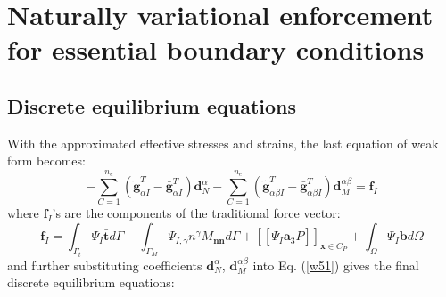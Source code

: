 \section{Naturally variational enforcement for essential boundary conditions}\label{boundary}
\subsection{Discrete equilibrium equations}
With the approximated effective stresses and strains, the last equation of weak form becomes:
\begin{equation}\label{w51}
- \sum_{C=1}^{n_e}(\tilde{\boldsymbol g}^T_{\alpha I} - \bar{\boldsymbol g}^T_{\alpha I}) \boldsymbol d_N^{\alpha}
- \sum_{C=1}^{n_e}(\tilde{\boldsymbol g}^T_{\alpha\beta I} - \bar{\boldsymbol g}^T_{\alpha\beta I}) \boldsymbol d_M^{\alpha\beta} = \boldsymbol f_I
\end{equation}
where $\boldsymbol f_I$'s are the components of the traditional force vector:
\begin{equation}
        \boldsymbol f_I = \int_{\Gamma_t} \Psi_I \bar{\boldsymbol t} d\Gamma - \int_{\Gamma_M} \Psi_{I,\gamma} n^\gamma \bar M_{\boldsymbol{nn}} d\Gamma + [[\Psi_I\boldsymbol a_3 \bar P]]_{\boldsymbol x\in C_P} + \int_\Omega \Psi_I \bar{\boldsymbol b} d\Omega
\end{equation}
and further substituting coefficients $\boldsymbol d_N^\alpha$, $\boldsymbol d_M^{\alpha\beta}$ into Eq. (\ref{w51}) gives the final discrete equilibrium equations: 
